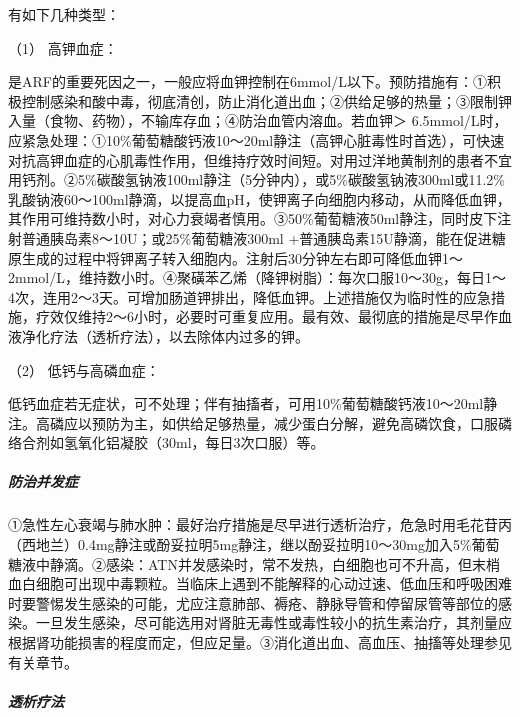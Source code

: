 有如下几种类型：

\hypertarget{text00083.htmlux5cux23CHP3-7-6-3-4-1}{}
（1） 高钾血症：

是ARF的重要死因之一，一般应将血钾控制在6mmol/L以下。预防措施有：①积极控制感染和酸中毒，彻底清创，防止消化道出血；②供给足够的热量；③限制钾入量（食物、药物），不输库存血；④防治血管内溶血。若血钾＞
6.5mmol/L时，应紧急处理：①10\%葡萄糖酸钙液10～20ml静注（高钾心脏毒性时首选），可快速对抗高钾血症的心肌毒性作用，但维持疗效时间短。对用过洋地黄制剂的患者不宜用钙剂。②5\%碳酸氢钠液100ml静注（5分钟内），或5\%碳酸氢钠液300ml或11.2\%乳酸钠液60～100ml静滴，以提高血pH，使钾离子向细胞内移动，从而降低血钾，其作用可维持数小时，对心力衰竭者慎用。③50\%葡萄糖液50ml静注，同时皮下注射普通胰岛素8～10U；或25\%葡萄糖液300ml
+普通胰岛素15U静滴，能在促进糖原生成的过程中将钾离子转入细胞内。注射后30分钟左右即可降低血钾1～2mmol/L，维持数小时。④聚磺苯乙烯（降钾树脂）：每次口服10～30g，每日1～4次，连用2～3天。可增加肠道钾排出，降低血钾。上述措施仅为临时性的应急措施，疗效仅维持2～6小时，必要时可重复应用。最有效、最彻底的措施是尽早作血液净化疗法（透析疗法），以去除体内过多的钾。

\hypertarget{text00083.htmlux5cux23CHP3-7-6-3-4-2}{}
（2） 低钙与高磷血症：

低钙血症若无症状，可不处理；伴有抽搐者，可用10\%葡萄糖酸钙液10～20ml静注。高磷应以预防为主，如供给足够热量，减少蛋白分解，避免高磷饮食，口服磷络合剂如氢氧化铝凝胶（30ml，每日3次口服）等。

\subparagraph{防治并发症}

①急性左心衰竭与肺水肿：最好治疗措施是尽早进行透析治疗，危急时用毛花苷丙（西地兰）0.4mg静注或酚妥拉明5mg静注，继以酚妥拉明10～30mg加入5\%葡萄糖液中静滴。②感染：ATN并发感染时，常不发热，白细胞也可不升高，但末梢血白细胞可出现中毒颗粒。当临床上遇到不能解释的心动过速、低血压和呼吸困难时要警惕发生感染的可能，尤应注意肺部、褥疮、静脉导管和停留尿管等部位的感染。一旦发生感染，尽可能选用对肾脏无毒性或毒性较小的抗生素治疗，其剂量应根据肾功能损害的程度而定，但应足量。③消化道出血、高血压、抽搐等处理参见有关章节。

\subparagraph{透析疗法}


